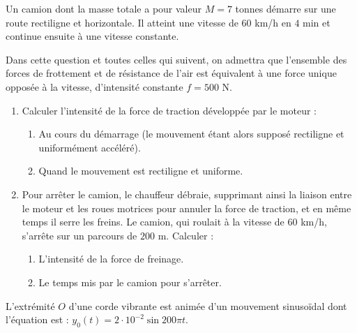 \documentclass[11pt]{article}
\begin{document}

Un camion dont la masse totale a pour valeur $M = 7$ tonnes démarre sur une route rectiligne et horizontale. Il atteint une vitesse de $60$ km/h en $4$ min et continue ensuite à une vitesse constante.

Dans cette question et toutes celles qui suivent, on admettra que l'ensemble des forces de frottement et de résistance de l'air est équivalent à une force unique opposée à la vitesse, d'intensité constante $f = 500$ N.

\begin{enumerate}
  \item Calculer l'intensité de la force de traction développée par le moteur :
  \begin{enumerate}[label=\alph*.]
    \item Au cours du démarrage (le mouvement étant alors supposé rectiligne et uniformément accéléré).
    \item Quand le mouvement est rectiligne et uniforme.
  \end{enumerate}
  \item Pour arrêter le camion, le chauffeur débraie, supprimant ainsi la liaison entre le moteur et les roues motrices pour annuler la force de traction, et en même temps il serre les freins. Le camion, qui roulait à la vitesse de $60$ km/h, s'arrête sur un parcours de $200$ m. Calculer :
  \begin{enumerate}[label=\alph*.]
    \item L'intensité de la force de freinage.
    \item Le temps mis par le camion pour s'arrêter.
  \end{enumerate}
\end{enumerate}

L'extrémité $O$ d'une corde vibrante est animée d'un mouvement sinusoïdal dont l'équation est : $y_0(t) = 2\cdot10^{-2}\sin 200\pi t$.
\end{document}
